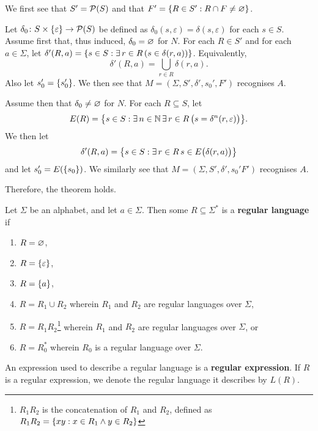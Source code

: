     We first see that \(S' = \pow(S)\) and that \(F' = \set{R \in S' : R \cap F
    \neq \nset}\).

    Let \(\map{\delta_0}{S \times \set{\varepsilon}}{\pow(S)}\) be defined as
    \(\delta_0(s, \varepsilon) = \delta(s, \varepsilon)\) for each \(s \in S\).
    Assume first that, thus induced, \(\delta_0 = \nset\) for \(N\). For each
    \(R \in S'\) and for each \(a \in \varSigma\), let \(\delta'(R, a) = \set{s
    \in S : \exists \, r \in R \, (s \in \delta(r, a))}\). Equivalently,
    \[
        \delta'(R, a) = \bigcup_{r \in R} \delta(r, a).
    \]
    Also let \(s_0' = \set{s_0'}\). We then see that \(M = (\varSigma, S',
    \delta', s_0', F')\) recognises \(A\).

    Assume then that \(\delta_0 \neq \nset\) for \(N\). For each \(R \subseteq S
    \), let
    \[
        E(R) = \set*{s \in S : \exists \, n \in \setnat \, \exists \, r \in R \,
        \big(s = \delta^n(r, \varepsilon)\big)}.
    \]
    We then let
    \[
        \delta'(R, a) = \set*{s \in S : \exists \, r \in R \, s \in
        E\big(\delta(r, a)\big)}
    \]
    and let \(s_0' = E(\set{s_0})\). We similarly see that \(M = (\varSigma, S',
    \delta', s_0' F')\) recognises \(A\).

    Therefore, the theorem holds.
\Epr

\Bdf
    Let \(\varSigma\) be an alphabet, and let \(a \in \varSigma\). Then some \(R
    \subseteq \varSigma^*\) is a {\bf regular language} if
    \begin{enumerate}
        \item \(R = \nset\),
        \item \(R = \set{\varepsilon}\),
        \item \(R = \set{a}\),
        \item \(R = R_1 \cup R_2\) wherein \(R_1\) and \(R_2\) are regular
        languages over \(\varSigma\),
        \item \(R = R_1 R_2\)\footnote{\(R_1 R_2\) is the concatenation of
        \(R_1\) and \(R_2\), defined as \(R_1 R_2 = \set{x y : x \in R_1 \land y
        \in R_2}\)} wherein \(R_1\) and \(R_2\) are regular languages over
        \(\varSigma\), or
        \item \(R = R_0^*\) wherein \(R_0\) is a regular language over
        \(\varSigma\).
    \end{enumerate}
\Edf

An expression used to describe a regular language is a {\bf regular expression}.
If \(R\) is a regular expression, we denote the regular language it describes by
\(L(R)\).

